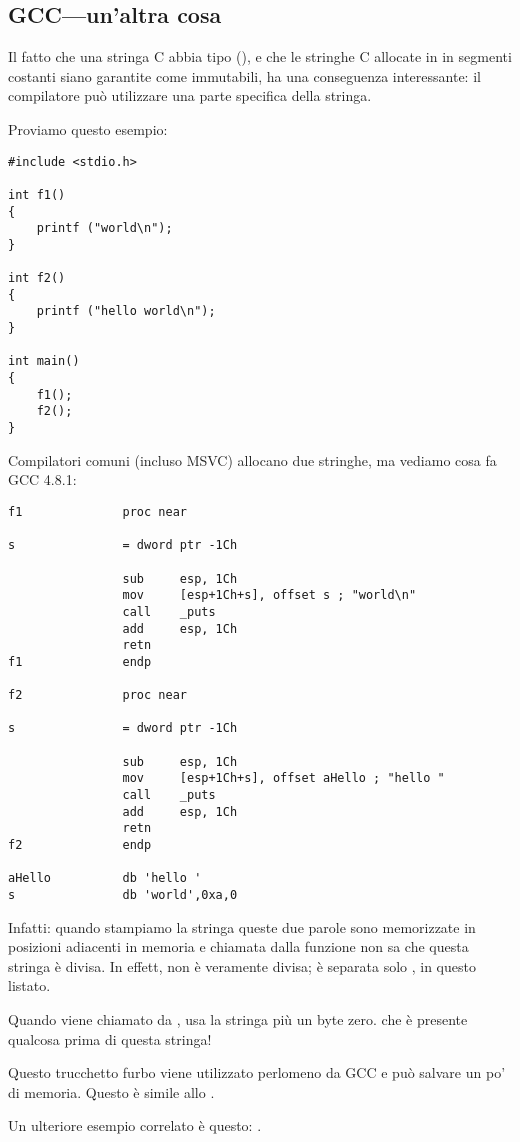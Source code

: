 \subsection{GCC---un'altra cosa}
\label{use_parts_of_C_strings}

Il fatto che una stringa C  abbia tipo  (),
e che le stringhe C allocate in in segmenti costanti siano garantite come immutabili, ha una conseguenza interessante:
il compilatore può utilizzare una parte specifica della stringa.

Proviamo questo esempio:

\begin{lstlisting}[style=customc]
#include <stdio.h>

int f1()
{
	printf ("world\n");
}

int f2()
{
	printf ("hello world\n");
}

int main()
{
	f1();
	f2();
}
\end{lstlisting}

Compilatori \CCpp{} comuni (incluso MSVC) allocano due stringhe, ma vediamo cosa fa GCC 4.8.1:

\begin{lstlisting}[caption=GCC 4.8.1 + IDA listing,style=customasmx86]
f1              proc near

s               = dword ptr -1Ch

                sub     esp, 1Ch
                mov     [esp+1Ch+s], offset s ; "world\n"
                call    _puts
                add     esp, 1Ch
                retn
f1              endp

f2              proc near

s               = dword ptr -1Ch

                sub     esp, 1Ch
                mov     [esp+1Ch+s], offset aHello ; "hello "
                call    _puts
                add     esp, 1Ch
                retn
f2              endp

aHello          db 'hello '
s               db 'world',0xa,0
\end{lstlisting}

Infatti: quando stampiamo la stringa 
queste due parole sono memorizzate in posizioni adiacenti in memoria e \puts chiamata dalla funzione 
non sa che questa stringa è divisa.
In effett, non è veramente divisa; è separata solo , in questo listato.

Quando \puts viene chiamato da , usa la stringa  più un byte zero. \puts che è presente qualcosa prima di questa stringa!

Questo trucchetto furbo viene utilizzato perlomeno da GCC e può salvare un po' di memoria.
Questo è simile allo .

Un ulteriore esempio correlato è questo: .

